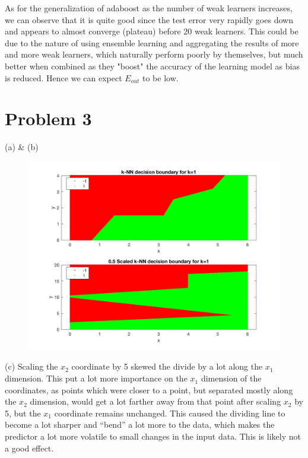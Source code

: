 \documentclass[12pt,letterpaper]{article}
\begin{document}
\begin{description}
As for the generalization of adaboost as the number of weak learners increases, we can observe that it is quite good since the test error very rapidly goes down and appears to almost converge (plateau) before 20 weak learners. This could be due to the nature of using ensemble learning and aggregating the results of more and more weak learners, which naturally perform poorly by themselves, but much better when combined as they "boost" the accuracy of the learning model as bias is reduced. Hence we can expect $E_{out}$ to be low.

\end{description}

\section*{Problem 3}
\begin{description}
	\item (a) \& (b)
\begin{figure}[H]
\includegraphics[scale=0.4]{image3.jpg} 
\end{figure}
	\item (c) Scaling the $x_2$ coordinate by 5 skewed the divide by a lot along the $x_1$ dimension. This put a lot more importance on the $x_1$ dimension of the coordinates, as points which were closer to a point, but separated mostly along the $x_2$ dimension, would get a lot farther away from that point after scaling $x_2$ by 5, but the $x_1$ coordinate remains unchanged. This caused the dividing line to become a lot sharper and “bend” a lot more to the data, which makes the predictor a lot more volatile to small changes in the input data. This is likely not a good effect.

\end{description}
\end{document}
